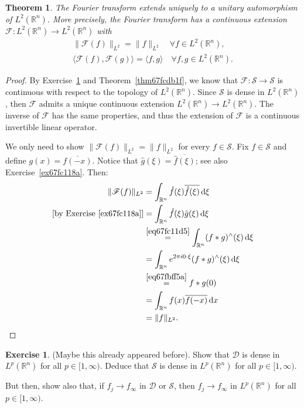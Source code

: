 \documentclass[a4paper,9pt]{amsart}
\newcommand{\scr}[1]{\mathscr{#1}}
\newcommand{\R}{\mathbb{R}}	%
\newcommand{\did}{\,\mathrm{d}}	%
\theoremstyle{plain}
\newtheorem{theorem}[proposition]{Theorem}
\theoremstyle{definition}
\newtheorem{exercise}[proposition]{Exercise}%
\theoremstyle{remark}
\begin{document}
\begin{theorem}
	The Fourier transform extends uniquely to a unitary automorphism of $L^2(\R^n)$.
	More precisely, the Fourier transform has a continuous extension $\scr F:L^2(\R^n)\to L^2(\R^n)$ with 
	\begin{gather}
		\|\scr F(f)\|_{L^2} = \|f\|_{L^2} \quad\forall f\in L^2(\R^n) , \\
		\langle \scr F(f),\scr F(g) \rangle = \langle f,g \rangle \quad\forall f,g\in L^2(\R^n) .
	\end{gather}
\end{theorem}
\begin{proof}
	By Exercise~\ref{ex67fc0c47} and Theorem~\ref{thm67fcdb1f}, we know that $\scr F:\scr S\to\scr S$ is continuous with respect to the topology of $L^2(\R^n)$.
	Since $\scr S$ is dense in $L^2(\R^n)$, then $\scr F$ admits a unique continuous extension $L^2(\R^n)\to L^2(\R^n)$.
	The inverse of $\scr F$ has the same properties, and thus the extension of $\scr F$ is a continuous invertible linear operator.
	
	We only need to show $\|\scr F(f)\|_{L^2} = \|f\|_{L^2}$ for every $f\in\scr S$.
	Fix $f\in\scr S$ and define $g(x) = \overline{f(-x)}$.
	Notice that $\hat g (\xi) = \overline{\hat f(\xi)}$; 
	see also Exercise~\ref{ex67fc118a}.
	Then:
	\begin{align}
		\|\scr F(f)\|_{L^2} 
		&= \int_{\R^n} \hat f(\xi) \overline{\hat f(\xi)} \did \xi \\
		[\text{by Exercise~\ref{ex67fc118a}}]
		&= \int_{\R^n} \hat f(\xi) \hat g (\xi) \did \xi \\
		&\overset{\eqref{eq67fc11d5}}= \int_{\R^n} (f*g)^{\wedge}(\xi) \did \xi \\
		&= \int_{\R^n} e^{2\pi i 0\cdot \xi}(f*g)^{\wedge}(\xi) \did \xi \\
		&\overset{\eqref{eq67fbff5a}}= f*g(0) \\
		&= \int_{\R^n} f(x) \overline{f(-x)} \did x \\
		&= \|f\|_{L^2} .
	\end{align}
\end{proof}

\begin{exercise}\label{ex67fc0c47}%
	(Maybe this already appeared before).
	Show that $\scr D$ is dense in $L^p(\R^n)$ for all $p\in[1,\infty)$.
	Deduce that $\scr S$ is dense in $L^p(\R^n)$ for all $p\in[1,\infty)$.
	
	But then, show also that, if $f_j\to f_\infty$ in $\scr D$ or $\scr S$, then $f_j\to f_\infty$ in $L^p(\R^n)$ for all $p\in[1,\infty)$.
\end{exercise}%
\end{document}
